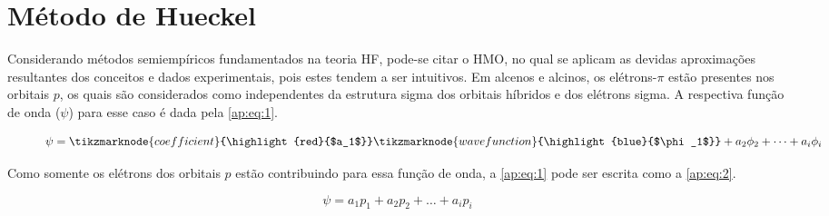\chapter{Método de Hueckel} \label{ap:HMO}

Considerando métodos semiempíricos fundamentados na teoria \gls{HF}, pode-se citar o \gls{HMO}, no qual se aplicam as devidas aproximações resultantes dos conceitos e dados experimentais, pois estes tendem a ser intuitivos. Em alcenos e alcinos, os elétrons-$\pi$ estão presentes nos orbitais $p$, os quais são considerados como independentes da estrutura sigma dos orbitais híbridos e dos elétrons sigma. A respectiva função de onda ($\psi$) para esse caso é dada pela \autoref{ap:eq:1}.

\begin{figure}[htb]
    \vspace{2\baselineskip}
\begin{equation}
    \label{ap:eq:1}
    \psi = \tikzmarknode{coefficient}{\highlight{red}{$a_1$}} \tikzmarknode{wavefunction}{\highlight{blue}{$\phi_1$}} + a_2\phi_2 + \dots + a_i \phi_i
\end{equation}
    \vspace{1\baselineskip}

\end{figure}

Como somente os elétrons dos orbitais $p$ estão contribuindo para essa função de onda, a \autoref{ap:eq:1} pode ser escrita como a \autoref{ap:eq:2}.

\begin{figure}[htb]
    \vspace{1\baselineskip}
\begin{equation}
    \label{ap:eq:2}
    \psi = a_1 p_1 + a_2 p_2 + \dots + a_i p_i
\end{equation}
\end{figure}

